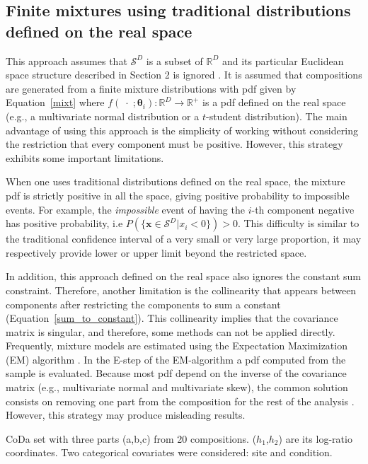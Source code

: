 \documentclass[12pt, a4paper]{article}
\newcommand{\m}[1]{\boldsymbol{#1}}
\begin{document}
\subsection{Finite mixtures using traditional distributions defined on the real space}
\label{real_section}

This approach assumes that $\mathcal{S}^D$ is a subset of $\mathbb{R}^D$ and its particular Euclidean space structure described in Section 2 is ignored \citep[see][]{papageorgiou2001model}. It is assumed that compositions  are generated from a finite mixture distributions with pdf given by Equation~\ref{mixt} where $f(\;\cdot\;;\m\theta_i): \mathbb{R}^D \rightarrow \mathbb{R}^+$ is a pdf defined on the real space (e.g., a multivariate normal distribution or a  $t$-student distribution). The main advantage of using this approach is the simplicity of working without considering the restriction that every component must be positive. However, this strategy exhibits some important limitations.

When one uses traditional distributions defined on the real space, the mixture pdf is strictly positive in all the space, giving positive probability to impossible events. For example, the \emph{impossible} event  of having the $i$-th component negative has positive probability, i.e $P(\{ \textbf{x} \in \mathcal{S}^D | x_i < 0 \}) > 0$. This difficulty is similar to the traditional confidence interval of a very small or very large proportion, it may respectively provide lower or upper limit beyond the restricted space. 

In addition, this approach defined on the real space also ignores the constant sum constraint. Therefore, another limitation is the collinearity that appears between components  after restricting the components to sum a constant (Equation~\ref{sum_to_constant}). This collinearity implies that the covariance matrix is singular, and therefore, some methods can not be applied directly. Frequently, mixture models are estimated using the Expectation Maximization (EM) algorithm \citep{dempster1977maximum}. In the E-step of the EM-algorithm a pdf computed from the sample is evaluated. Because most pdf depend on the inverse of the covariance matrix (e.g., multivariate normal and multivariate skew), the common solution consists on removing one part from the composition for the rest of the analysis \citep{papageorgiou2001model}. However, this strategy may  produce misleading results.   


\begin{table}
\centering
\scriptsize

\caption{CoDa set with three parts (a,b,c) from 20 compositions. ($h_1$,$h_2$) are its log-ratio coordinates.
Two categorical covariates were considered: site and condition. }
\label{example_elim_tab}
\end{table}
\end{document}
